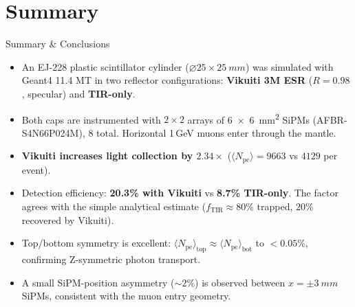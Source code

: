 \documentclass[aspectratio=169,10pt]{beamer}
\begin{document}
\section{Summary}

\begin{frame}{Summary \& Conclusions}

\begin{itemize}\setlength\itemsep{0.5em}

  \item[\textbf{1.}]
    An EJ-228 plastic scintillator cylinder ($\varnothing25\times\SI{25}{mm}$)
    was simulated with Geant4 11.4 MT in two reflector configurations:
    \textbf{Vikuiti 3M ESR} ($R=0.98$, specular) and \textbf{TIR-only}.

  \item[\textbf{2.}]
    Both caps are instrumented with $2\times2$ arrays of
    \SI{6x6}{mm^2} SiPMs (AFBR-S4N66P024M), 8 total.
    Horizontal 1\,GeV muons enter through the mantle.

  \item[\textbf{3.}]
    \textbf{Vikuiti increases light collection by $2.34\times$}
    ($\langle N_\text{pe}\rangle = 9663$ vs $4129$ per event).

  \item[\textbf{4.}]
    Detection efficiency: \textbf{20.3\% with Vikuiti} vs \textbf{8.7\% TIR-only}.
    The factor agrees with the simple analytical estimate
    ($f_\text{TIR} \approx 80\%$ trapped, $20\%$ recovered by Vikuiti).

  \item[\textbf{5.}]
    Top/bottom symmetry is excellent: $\langle N_\text{pe}\rangle_\text{top}
    \approx \langle N_\text{pe}\rangle_\text{bot}$ to $<0.05\%$, confirming
    Z-symmetric photon transport.

  \item[\textbf{6.}]
    A small SiPM-position asymmetry ($\sim 2\%$) is observed between
    $x=\pm\SI{3}{mm}$ SiPMs, consistent with the muon entry geometry.

\end{itemize}

\end{frame}
\end{document}
